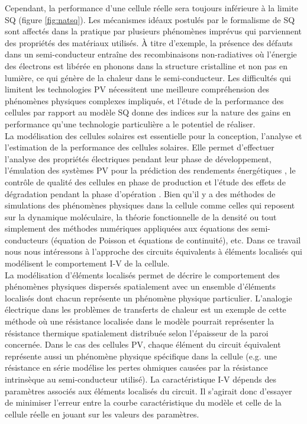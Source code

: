 Cependant, la performance d'une cellule réelle sera toujours inférieure à la limite SQ (figure \ref{fig:natsq}). Les mécanismes idéaux postulés par le formalisme de SQ sont affectés dans la pratique par plusieurs phénomènes imprévus qui parviennent des propriétés des matériaux utilisés. À titre d'exemple, la présence des défauts dans un semi-conducteur entraîne des recombinaisons non-radiatives où l'énergie des électrons est libérée en phonons dans la structure cristalline et non pas en lumière, ce qui génère de la chaleur dans le semi-conducteur. Les difficultés qui limitent les technologies PV nécessitent une meilleure compréhension des phénomènes physiques complexes impliqués, et l'étude de la performance des cellules par rapport au modèle SQ donne des indices sur la nature des gains en performance qu'une technologie particulière a le potentiel de réaliser.\\
La modélisation des cellules solaires est essentielle pour la conception, l'analyse et l'estimation de la performance des cellules solaires. Elle permet d'effectuer l'analyse des propriétés électriques pendant leur phase de développement, l'émulation des systèmes PV pour la prédiction des rendements énergétiques \cite{Ram2018}, le contrôle de qualité des cellules en phase de production %
et l'étude des effets de dégradation pendant la phase d'opération \cite{Kennerud1969, Jamil2017}. Bien qu'il y a des méthodes de simulations des phénomènes physiques dans la cellule comme celles qui reposent sur la dynamique moléculaire, la théorie fonctionnelle de la densité ou tout simplement des méthodes numériques appliquées aux équations des semi-conducteurs (équation de Poisson et équations de continuité), etc. Dans ce travail nous nous intéressons à l'approche des circuits équivalents à éléments localisés qui modélisent le comportement I-V de la cellule.\\
La modélisation d'éléments localisés permet de décrire le comportement des phénomènes physiques dispersés spatialement avec un ensemble d'éléments localisés dont chacun représente un phénomène physique particulier. L'analogie électrique dans les problèmes de transferts de chaleur est un exemple de cette méthode où une résistance localisée dans le modèle pourrait représenter la résistance thermique spatialement distribuée selon l'épaisseur de la paroi concernée. Dans le cas des cellules PV, chaque élément du circuit équivalent représente aussi un phénomène physique spécifique dans la cellule (e.g. une résistance en série modélise les pertes ohmiques causées par la résistance intrinsèque au semi-conducteur utilisé). La caractéristique I-V dépends des paramètres associés aux éléments localisés du circuit. Il s'agirait donc d'essayer de minimiser l'erreur entre la courbe caractéristique du modèle et celle de la cellule réelle en jouant sur les valeurs des paramètres. 
